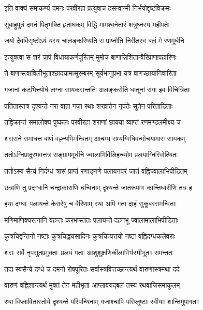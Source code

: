 \twolineshloka
{इति वाक्यं समाकर्ण्य दमनः परवीरहा}
{प्रत्युवाच हसन्वाग्मी निर्भयोद्दृष्टविक्रमः}%

\twolineshloka
{सुबाहुपुत्रं दमनं पितृभक्ति हृताघकम्}
{विद्धि मामश्वनेतारं शत्रुघ्नस्य महीपतेः}%

\twolineshloka
{जयो दैवविसृष्टोऽयं यस्य चालङ्करिष्यति}
{स प्राप्नोति निरीक्षस्व बलं मे रणमूर्धनि}%

\twolineshloka
{इत्युक्त्वा स शरं चापं विधायाकर्णपूरितम्}
{मुमोच बाणान्निशितान्वैरिप्राणापहारिणः}%

\twolineshloka
{ते बाणास्त्वाविलीभूताश्छादयामासुरम्बरम्}
{सूर्यभानुप्रभा यत्र बाणच्छायानिवारिता}%

\twolineshloka
{गजानां कटभित्त्योघे लग्ना सायकसन्ततिः}
{अलङ्करोति धातूनां रागा इव विचित्रिताः}%

\twolineshloka
{पतितास्तत्र दृश्यन्ते नरा वाहा गजा रथाः}
{शरव्रातेन नृपतेः सुतेन परिताडिताः}%

\twolineshloka
{तद्विक्रान्तं समालोक्य पुष्कलः परवीरहा}
{शराणां छायया व्याप्तं रणमण्डलमीक्ष्य च}%

\twolineshloka
{शरासने समाधत्त बाणं वह्न्यभिमन्त्रितम्}
{आचम्य सम्यग्विधिवन्मोचयामास सायकम्}%

\twolineshloka
{ततोऽग्निप्रादुरभवत्तत्र सङ्ग्राममूर्धनि}
{ज्वालाभिर्विलिहन्व्योम प्रलयाग्निरिवोत्थितः}%

\twolineshloka
{ततोऽस्य सैन्यं निर्दग्धं त्रासं प्राप्तं रणाङ्गणे}
{पलायनपरं जातं वह्निज्वालाभिपीडितम्}%

\twolineshloka
{छत्राणि तु प्रदग्धानि चन्द्राकाराणि धन्विनाम्}
{दृश्यन्ते जातरूपाभ कान्तिधारीणि तत्र ह}%

\twolineshloka
{हया दग्धाः पलायन्ते केसरेषु च वैरिणाम्}
{रथा अपि गता दाहं सुकूबरसमन्विताः}%

\twolineshloka
{मणिमाणिक्यरत्नानि वहन्तः करभास्ततः}
{पलायन्ते दहनभू ज्वालामालाभिपीडिताः}%

\twolineshloka
{कुत्रचिद्दन्तिनो नष्टाः कुत्रचिद्धयसादिनः}
{कुत्रचित्पत्तयो नष्टा वह्निदग्धकलेवराः}%

\twolineshloka
{शराः सर्वे नृपसुतप्रमुक्ताः प्रलयं गताः}
{आशुशुक्षणिकीलाभिर्भस्मीभूताः समन्ततः}%

\twolineshloka
{तदा स्वसैन्ये दग्धे च दमनो रोषपूरितः}
{सर्वास्त्रवित्तच्छान्त्यर्थं वारुणास्त्रमथा ददे}%

\twolineshloka
{वारुणं वह्निशान्त्यर्थं मुक्तं तेन महीभृता}
{आप्लावयद्बलं तस्य रथवाजिसमाकुलम्}%

\twolineshloka
{रथा विप्लावितास्तोये दृश्यन्ते परिपन्थिनाम्}
{गजाश्चापि परिप्लुष्टाः स्वीयाः शान्तिमुपागताः}%

